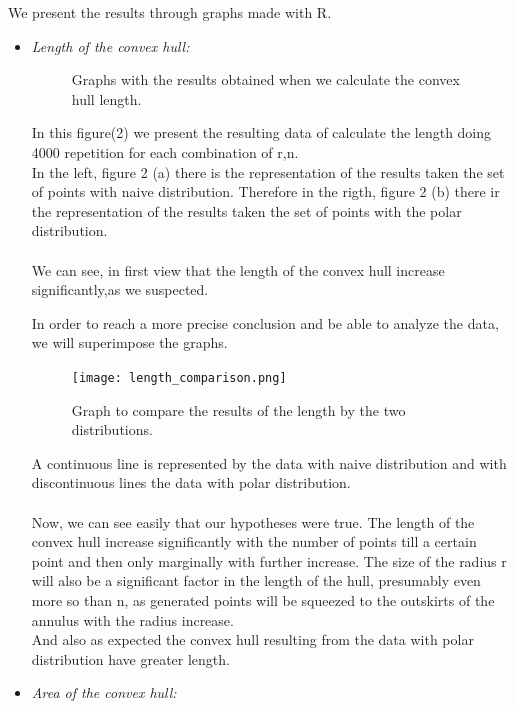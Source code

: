 \documentclass[12pt,a4paper]{article}
\begin{document}
We present the results through graphs made with R. 
\begin{itemize}
\item \emph{Length of the convex hull:}

\begin{figure}[H]
 \centering
 \caption{Graphs with the results obtained when we calculate the convex hull length.}
 \label{f:results_length}
\end{figure}

In this figure(2) we present the resulting data of calculate the length doing 4000 repetition for each combination of r,n. \\
 In the left, figure 2 (a) there is the representation of the results taken the set of points with naive distribution. Therefore in the rigth, figure 2 (b) there ir the representation of the results taken the set of points with the polar distribution. \\
 \\
We can see, in first view that the length of the convex hull increase significantly,as we suspected.

In order to reach a more precise conclusion and be able to analyze the data, we will superimpose the graphs.
\begin{figure}[hbtp]
\centering
\texttt{[image: length\_comparison.png]}
\caption{Graph to compare the results of the length by the two distributions.}
\end{figure}

A continuous line is represented by the data with naive distribution and with discontinuous lines the data with polar distribution.\\
\\
Now, we can see easily that our hypotheses were true. The length of the convex hull increase significantly with the number of points till a certain point and then only marginally with further increase. The size of the radius r will also be a significant factor in the length of the hull, presumably even more so than n, as generated points will be squeezed to the outskirts of the annulus with the radius increase. \\
And also as expected the convex hull resulting from the data with polar distribution have greater length.\pagebreak 

\item \emph{Area of the convex hull:}



\end{itemize}
\end{document}

